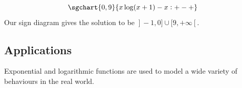 \begin{example}
\begin{enumerate}
$$
\sgchart{0,9} {x \log(x+1)  - x: +-+}
$$
 Our sign diagram gives the solution to be $\left.\right]-1,0] \cup [9, +\infty\left[\right.$. 


\end{enumerate}


\end{example}

%
%
%
%
%



\ifcourse

\ifanalysis\pagebreak\fi
\subsection{Applications}
Exponential and logarithmic functions are used to model a wide variety of behaviours in the real world. 

